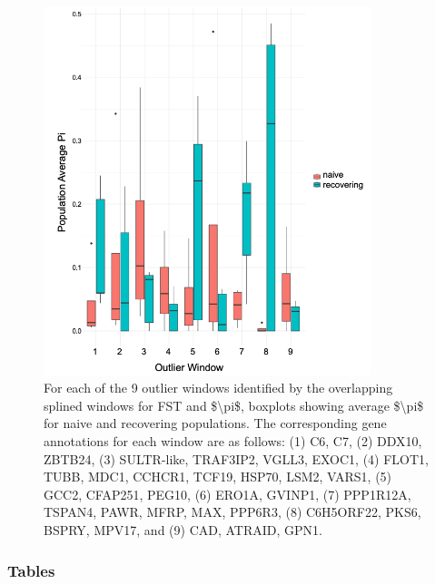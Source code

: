 \documentclass[9pt,twoside,lineno]{pnas-new}
\begin{document}
\begin{figure}

{\centering \includegraphics[width=0.85\textwidth]{figures/boxplot_pi_by_windowpop.png}

}

\caption{\label{fig-boxplot-pi-by-windowpop}For each of the 9 outlier
windows identified by the overlapping splined windows for FST and
\$\textbackslash pi\$, boxplots showing average \$\textbackslash pi\$
for naive and recovering populations. The corresponding gene annotations
for each window are as follows: (1) C6, C7, (2) DDX10, ZBTB24, (3)
SULTR-like, TRAF3IP2, VGLL3, EXOC1, (4) FLOT1, TUBB, MDC1, CCHCR1,
TCF19, HSP70, LSM2, VARS1, (5) GCC2, CFAP251, PEG10, (6) ERO1A, GVINP1,
(7) PPP1R12A, TSPAN4, PAWR, MFRP, MAX, PPP6R3, (8) C6H5ORF22, PKS6,
BSPRY, MPV17, and (9) CAD, ATRAID, GPN1.}

\end{figure}\clearpage

\newpage

\hypertarget{tables}{%
\subsubsection{Tables}\label{tables}}
\end{document}
